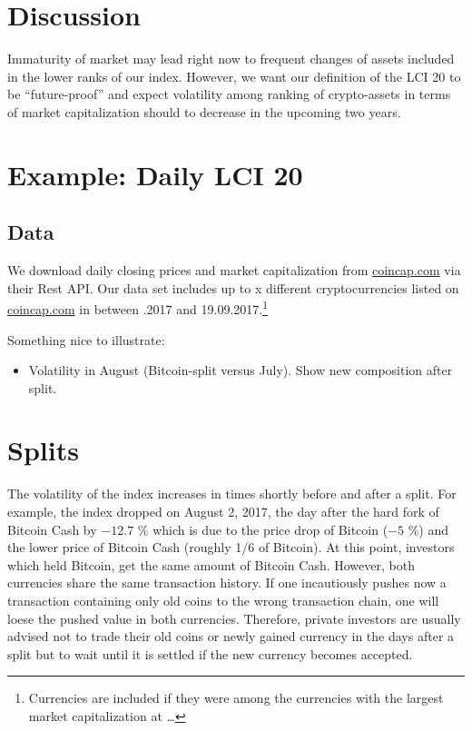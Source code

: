 \documentclass[11pt]{article}
\begin{document}
\section{Discussion}

Immaturity of market may lead right now to frequent changes of assets included in the lower ranks of our index.
However, we want our definition of the LCI 20 to be ``future-proof'' and expect volatility among ranking of crypto-assets in terms of market capitalization should to decrease in the upcoming two years.


\section{Example: Daily LCI 20}

\subsection{Data}

We download daily closing prices and market capitalization from \href{https://coincap.com}{coincap.com} via their Rest API.
Our data set includes up to x different cryptocurrencies listed on \href{https://coincap.com}{coincap.com} in between .2017 and 19.09.2017.\footnote{Currencies are included if they were among the currencies with the largest market capitalization at \dots}


Something nice to illustrate:
\begin{itemize}
  \item Volatility in August (Bitcoin-split versus July). Show new composition after split.
\end{itemize}

\section{Splits}

The volatility of the index increases in times shortly before and after a split.
For example, the index dropped on August 2, 2017, the day after the hard fork of Bitcoin Cash by $-12.7$ \% which is due to the price drop of Bitcoin ($-5$ \%) and the lower price of Bitcoin Cash (roughly 1/6 of Bitcoin).
At this point, investors which held Bitcoin, get the same amount of Bitcoin Cash.
However, both currencies share the same transaction history.
If one incautiously pushes now a transaction containing only old coins to the wrong transaction chain, one will loese the pushed value in both currencies.
Therefore, private investors are usually advised not to trade their old coins or newly gained currency in the days after a split but to wait until it is settled if the new currency becomes accepted.
\end{document}

